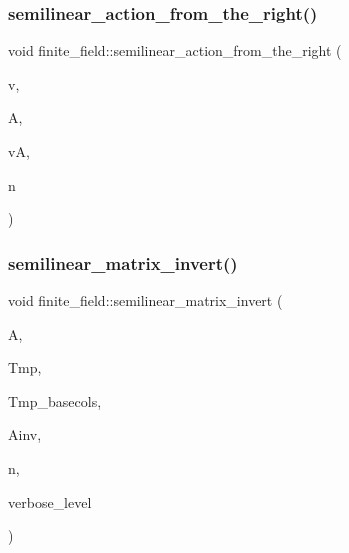 \mbox{\label{classfinite__field_a3e524b9391520005b083dfc4c9306302}} 
\subsubsection{\texorpdfstring{semilinear\+\_\+action\+\_\+from\+\_\+the\+\_\+right()}{semilinear\_action\_from\_the\_right()}}
{\footnotesize\ttfamily void finite\+\_\+field\+::semilinear\+\_\+action\+\_\+from\+\_\+the\+\_\+right (\begin{DoxyParamCaption}\item[{\mbox{\hyperlink{galois_8h_a09fddde158a3a20bd2dcadb609de11dc}{I\+NT}} $\ast$}]{v,  }\item[{\mbox{\hyperlink{galois_8h_a09fddde158a3a20bd2dcadb609de11dc}{I\+NT}} $\ast$}]{A,  }\item[{\mbox{\hyperlink{galois_8h_a09fddde158a3a20bd2dcadb609de11dc}{I\+NT}} $\ast$}]{vA,  }\item[{\mbox{\hyperlink{galois_8h_a09fddde158a3a20bd2dcadb609de11dc}{I\+NT}}}]{n }\end{DoxyParamCaption})}

\mbox{\label{classfinite__field_a940fec6a9c31b10eed2e8d37c5472d93}} 
\subsubsection{\texorpdfstring{semilinear\+\_\+matrix\+\_\+invert()}{semilinear\_matrix\_invert()}}
{\footnotesize\ttfamily void finite\+\_\+field\+::semilinear\+\_\+matrix\+\_\+invert (\begin{DoxyParamCaption}\item[{\mbox{\hyperlink{galois_8h_a09fddde158a3a20bd2dcadb609de11dc}{I\+NT}} $\ast$}]{A,  }\item[{\mbox{\hyperlink{galois_8h_a09fddde158a3a20bd2dcadb609de11dc}{I\+NT}} $\ast$}]{Tmp,  }\item[{\mbox{\hyperlink{galois_8h_a09fddde158a3a20bd2dcadb609de11dc}{I\+NT}} $\ast$}]{Tmp\+\_\+basecols,  }\item[{\mbox{\hyperlink{galois_8h_a09fddde158a3a20bd2dcadb609de11dc}{I\+NT}} $\ast$}]{Ainv,  }\item[{\mbox{\hyperlink{galois_8h_a09fddde158a3a20bd2dcadb609de11dc}{I\+NT}}}]{n,  }\item[{\mbox{\hyperlink{galois_8h_a09fddde158a3a20bd2dcadb609de11dc}{I\+NT}}}]{verbose\+\_\+level }\end{DoxyParamCaption})}

